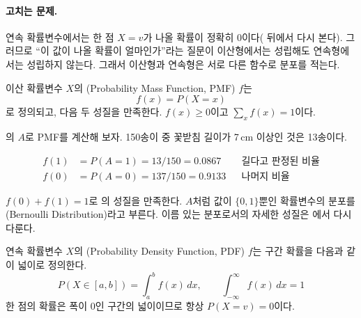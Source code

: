 \paragraph{고치는 문제.} 연속 확률변수에서는 한 점 $X=v$가 나올 확률이
정확히 0이다( 뒤에서 다시 본다). 그러므로 ``이 값이 나올
확률이 얼마인가''라는 질문이 이산형에서는 성립해도 연속형에서는 성립하지
않는다. 그래서 이산형과 연속형은 서로 다른 함수로 분포를 적는다.

\begin{definition}[확률질량함수]
\label{def:pmf}
이산 확률변수 $X$의 (Probability Mass Function, PMF)
$f$는
\[
  f(x) = P(X = x)
\]
로 정의되고, 다음 두 성질을 만족한다. $f(x) \ge 0$이고
$\sum_x f(x) = 1$이다.
\end{definition}

의 $A$로 PMF를 계산해 보자. 150송이 중
꽃받침 길이가 7\,cm 이상인 것은 13송이다.

\begin{align*}
  f(1) &= P(A=1) = 13/150 = 0.0867  && \text{길다고 판정된 비율}\\
  f(0) &= P(A=0) = 137/150 = 0.9133 && \text{나머지 비율}
\end{align*}

$f(0) + f(1) = 1$로 의 성질을 만족한다. $A$처럼 값이
$\{0,1\}$뿐인 확률변수의 분포를 (Bernoulli
Distribution)라고 부른다. 이름 있는 분포로서의 자세한 성질은
에서 다시 다룬다.

\begin{definition}[확률밀도함수]
\label{def:pdf}
연속 확률변수 $X$의 (Probability Density Function,
PDF) $f$는 구간 확률을 다음과 같이 넓이로 정의한다.
\[
  P(X \in [a,b]) = \int_a^b f(x)\,dx, \qquad \int_{-\infty}^{\infty} f(x)\,dx = 1
\]
한 점의 확률은 폭이 0인 구간의 넓이이므로 항상 $P(X=v) = 0$이다.
\end{definition}

